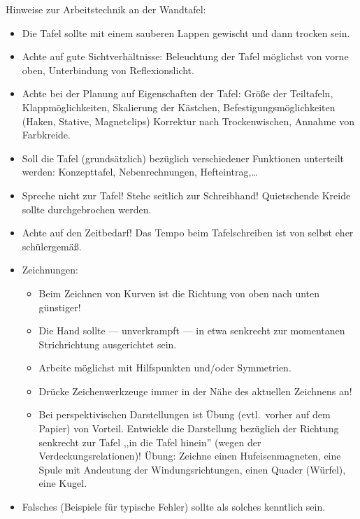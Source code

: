 \bip
Hinweise zur Arbeits\-technik  an der Wandtafel:
\begin{itemize}
\item
Die Tafel sollte mit einem sauberen Lappen gewischt und dann
trocken sein.
\item
Achte auf gute Sichtverh\"{a}ltnisse: Beleuchtung der Tafel
m\"{o}glichst von vorne oben, Unterbindung von Reflexionslicht.
\item
Achte bei der Planung auf Eigenschaften der Tafel:
Gr\"{o}{\ss}e der Teiltafeln, Klappm\"{o}glichkeiten, Skalierung der K\"{a}stchen,
Befestigungsm\"{o}glichkeiten (Haken, Stative, Magnetclips)
Korrektur nach Trockenwischen, Annahme von Farbkreide.
\item
Soll die Tafel (grunds\"{a}tzlich) bez\"{u}glich verschiedener
Funktionen unterteilt werden: Konzepttafel, Nebenrechnungen,
Hefteintrag,\dots

\item
Spreche nicht zur Tafel! Stehe seitlich zur Schreibhand!
Quietschende Kreide sollte durchgebrochen werden.
\item
Achte auf den Zeitbedarf!
Das Tempo beim Tafelschreiben ist von selbst eher sch\"{u}lergem\"{a}{\ss}.
\item
Zeichnungen:
\begin{itemize}
\item
Beim Zeichnen von Kurven ist die Richtung von oben nach
unten g\"{u}nstiger!
\item
Die Hand sollte ---  unverkrampft --- in etwa senkrecht
zur momentanen Strichrichtung ausgerichtet sein.
\item
Arbeite m\"{o}glichst mit Hilfspunkten und/oder Symmetrien.
\item
Dr\"{u}cke Zeichenwerkzeuge immer in der N\"{a}he des aktuellen
Zeichnens an!
\item
Bei perspektivischen Darstellungen ist \"{U}bung (evtl.\ vorher
auf dem Papier) von Vorteil.
Entwickle die Darstellung bez\"{u}glich der Richtung senkrecht zur
Tafel ,,in die Tafel hinein'' (wegen der Verdeckungsrelationen)!
\mip
\"{U}bung: Zeichne einen Hufeisenmagneten, eine Spule
mit Andeutung der Windungsrichtungen, einen Quader (W\"{u}rfel),
eine Kugel.
\end{itemize}
\item
Falsches (Beispiele f\"{u}r typische Fehler) sollte als solches
kenntlich sein.
\end{itemize}

